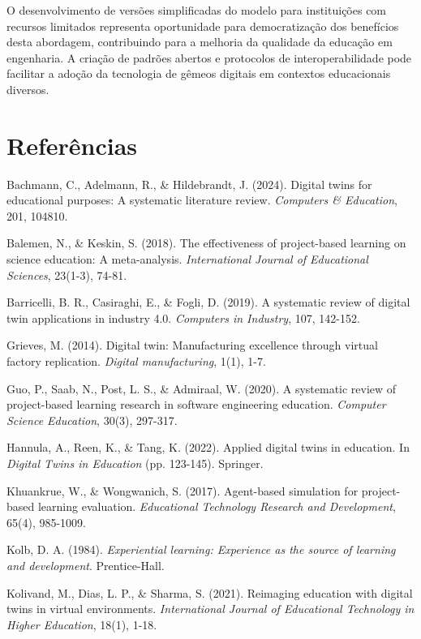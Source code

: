 \documentclass[english, spanish, brazilian]{modelo_dt}
\begin{document}
O desenvolvimento de versões simplificadas do modelo para instituições com recursos limitados representa oportunidade para democratização dos benefícios desta abordagem, contribuindo para a melhoria da qualidade da educação em engenharia\@. A criação de padrões abertos e protocolos de interoperabilidade pode facilitar a adoção da tecnologia de gêmeos digitais em contextos educacionais diversos\@.

\section*{Referências}

\noindent
Bachmann, C., Adelmann, R., \& Hildebrandt, J. (2024). Digital twins for educational purposes: A systematic literature review. \textit{Computers \& Education}, 201, 104810.

\noindent
Balemen, N., \& Keskin, S. (2018). The effectiveness of project-based learning on science education: A meta-analysis. \textit{International Journal of Educational Sciences}, 23(1-3), 74-81.

\noindent
Barricelli, B. R., Casiraghi, E., \& Fogli, D. (2019). A systematic review of digital twin applications in industry 4.0. \textit{Computers in Industry}, 107, 142-152.

\noindent
Grieves, M. (2014). Digital twin: Manufacturing excellence through virtual factory replication. \textit{Digital manufacturing}, 1(1), 1-7.

\noindent
Guo, P., Saab, N., Post, L. S., \& Admiraal, W. (2020). A systematic review of project-based learning research in software engineering education. \textit{Computer Science Education}, 30(3), 297-317.

\noindent
Hannula, A., Reen, K., \& Tang, K. (2022). Applied digital twins in education. In \textit{Digital Twins in Education} (pp. 123-145). Springer.

\noindent
Khuankrue, W., \& Wongwanich, S. (2017). Agent-based simulation for project-based learning evaluation. \textit{Educational Technology Research and Development}, 65(4), 985-1009.

\noindent
Kolb, D. A. (1984). \textit{Experiential learning: Experience as the source of learning and development}. Prentice-Hall.

\noindent
Kolivand, M., Dias, L. P., \& Sharma, S. (2021). Reimaging education with digital twins in virtual environments. \textit{International Journal of Educational Technology in Higher Education}, 18(1), 1-18.
\end{document}
